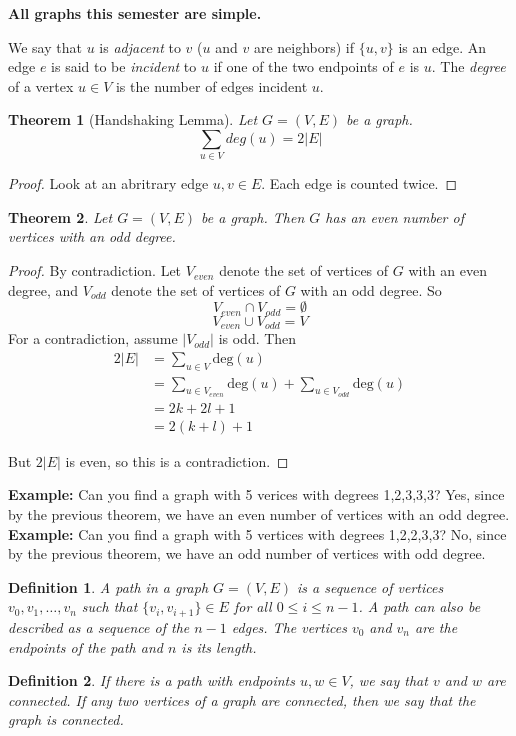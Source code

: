 \documentclass[openany]{report}
\newtheorem{theorem}{Theorem}[section]
\newtheorem{definition}{Definition}[section]
\begin{document}
\begin{center}
    \textbf{ All graphs this semester are simple.}
\end{center}
We say that $u$ is \emph{adjacent} to $v$ ($u$ and $v$ are neighbors) if $\{u,v\}$ is an edge. An edge $e$ is said to be \emph{incident} to $u$ if one of the two endpoints of $e$ is $u$. The \emph{degree} of a vertex $u \in V$ is the number of edges incident $u$.
\begin{theorem}[Handshaking Lemma]
    Let $G = (V,E)$ be a graph. 
    \[\sum_{u \in V} deg(u) = 2|E|\]
\end{theorem} 
\begin{proof}
    Look at an abritrary edge ${u,v} \in E$. Each edge is counted twice.
\end{proof}
\begin{theorem}
    Let $G = (V,E)$ be a graph. Then $G$ has an even number of vertices with an odd degree.
\end{theorem}
\begin{proof}
    By contradiction. Let $V_{even}$ denote the set of vertices of $G$ with an even degree, and $V_{odd}$ denote the set of vertices of $G$ with an odd degree. So 
    \[V_{even} \cap V_{odd} = \emptyset\]
    \[V_{even} \cup V_{odd} = V\]
    For a contradiction, assume $|V_{odd}|$ is odd. Then
    \begin{align*}
        2|E| &= \sum_{u \in V} \text{deg}(u)\tag{Handshaking Lemma}\\
        &= \sum_{u \in V_{even}}\text{deg}(u) + \sum_{u \in V_{odd}}\text{deg}(u)\\
        &= 2k + 2l+1\\
        &= 2(k+l)+1
    \end{align*}

    But $2|E|$ is even, so this is a contradiction.
    
\end{proof}
\noindent
\textbf{Example:} Can you find a graph with 5 verices with degrees 1,2,3,3,3? Yes, since by the previous theorem, we have an even number of vertices with an odd degree. \\[3ex]
\noindent
\textbf{Example:} Can you find a graph with 5 vertices with degrees 1,2,2,3,3? No, since by the previous theorem, we have an odd number of vertices with odd degree. 
\begin{definition}
    A \emph{path} in a graph $G = (V,E)$ is a sequence of vertices $v_0, v_1, \ldots, v_n$ such that $\{v_i,v_{i+1}\} \in E$ for all $0 \leq i \leq n-1$. A path can also be described as a sequence of the $n -1$ edges. The vertices $v_0$ and $v_n$ are the \emph{endpoints} of the path and $n$ is its \emph{length}.
\end{definition}
\begin{definition}
    If there is a path with endpoints $u,w \in V$, we say that $v$ and $w$ are \emph{connected}. If any two vertices of a graph are connected, then we say that the graph is \emph{connected}.
\end{definition}
\end{document}

